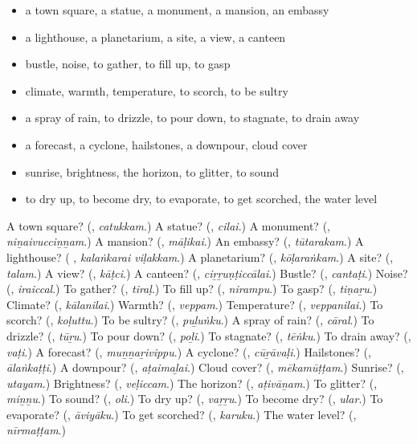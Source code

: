 \begin{itemize}
\raggedright
  \item a town square, a statue, a monument, a mansion, an embassy
  \item a lighthouse, a planetarium, a site, a view, a canteen
  \item bustle, noise, to gather, to fill up, to gasp
  \item climate, warmth, temperature, to scorch, to be sultry
  \item a spray of rain, to drizzle, to pour down, to stagnate, to drain away
  \item a forecast, a cyclone, hailstones, a downpour, cloud cover
  \item sunrise, brightness, the horizon, to glitter, to sound
  \item to dry up, to become dry, to evaporate, to get scorched, the water level
\end{itemize}

\begin{tcolorbox}[breakable,colback=teal!4,colframe=teal!35!black,title={Before you move on}]
A town square? (\textbf{}, \emph{catukkam}.) A statue? (\textbf{}, \emph{cilai}.) A monument? (\textbf{}, \emph{niṉaivucciṉṉam}.) A mansion? (\textbf{}, \emph{māḷikai}.) An embassy? (\textbf{}, \emph{tūtarakam}.) A lighthouse? (\textbf{ }, \emph{kalaṅkarai viḷakkam}.) A planetarium? (\textbf{}, \emph{kōḷaraṅkam}.) A site? (\textbf{}, \emph{talam}.) A view? (\textbf{}, \emph{kāṭci}.) A canteen? (\textbf{}, \emph{ciṟṟuṇṭiccālai}.) Bustle? (\textbf{}, \emph{cantaṭi}.) Noise? (\textbf{}, \emph{iraiccal}.) To gather? (\textbf{}, \emph{tiraḷ}.) To fill up? (\textbf{}, \emph{nirampu}.) To gasp? (\textbf{}, \emph{tiṇaṟu}.) Climate? (\textbf{}, \emph{kālanilai}.) Warmth? (\textbf{}, \emph{veppam}.) Temperature? (\textbf{}, \emph{veppanilai}.) To scorch? (\textbf{}, \emph{koḷuttu}.) To be sultry? (\textbf{}, \emph{puḻuṅku}.) A spray of rain? (\textbf{}, \emph{cāral}.) To drizzle? (\textbf{}, \emph{tūṟu}.) To pour down? (\textbf{}, \emph{poḻi}.) To stagnate? (\textbf{}, \emph{tēṅku}.) To drain away? (\textbf{}, \emph{vaṭi}.) A forecast? (\textbf{}, \emph{muṉṉaṟivippu}.) A cyclone? (\textbf{}, \emph{cūṟāvaḷi}.) Hailstones? (\textbf{}, \emph{ālaṅkaṭṭi}.) A downpour? (\textbf{}, \emph{aṭaimaḻai}.) Cloud cover? (\textbf{}, \emph{mēkamūṭṭam}.) Sunrise? (\textbf{}, \emph{utayam}.) Brightness? (\textbf{}, \emph{veḷiccam}.) The horizon? (\textbf{}, \emph{aṭivāṉam}.) To glitter? (\textbf{}, \emph{miṉṉu}.) To sound? (\textbf{}, \emph{oli}.) To dry up? (\textbf{}, \emph{vaṟṟu}.) To become dry? (\textbf{}, \emph{ular}.) To evaporate? (\textbf{}, \emph{āviyāku}.) To get scorched? (\textbf{}, \emph{karuku}.) The water level? (\textbf{}, \emph{nīrmaṭṭam}.)
\end{tcolorbox}
